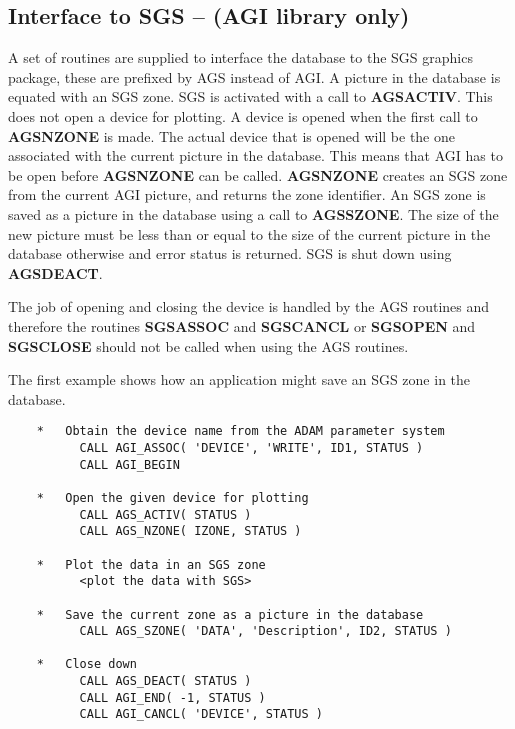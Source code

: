 \documentclass[twoside,11pt]{article}
\newcommand{\htmlref}[2]{#1}
\newcommand{\xref}[3]{#1}
\renewcommand{\_}{\texttt{\symbol{95}}}
\begin{document}
\subsection{Interface to SGS -- ({\bf AGI} library only)}

A set of routines are supplied to interface the database to the SGS graphics
package, these are prefixed by AGS\_ instead of AGI\_.
A picture in the database is equated with an SGS zone.
SGS is activated with a call to \htmlref{{\bf AGS\_ACTIV}}{AGS_ACTIV}.
This does not open a device for plotting.
A device is opened when the first call to \htmlref{{\bf AGS\_NZONE}}{AGS_NZONE}
is made.
The actual device that is opened will be the one associated with the
current picture in the database.
This means that AGI has to be open before {\bf AGS\_NZONE} can be called.
{\bf AGS\_NZONE} creates an SGS zone from the current AGI picture, and returns
the zone identifier.
An SGS zone is saved as a picture in the database using a call to
\htmlref{{\bf AGS\_SZONE}}{AGS_SZONE}. 
The size of the new picture must be less than or equal
to the size of the current picture in the database otherwise and error
status is returned.
SGS is shut down using \htmlref{{\bf AGS\_DEACT}}{AGS_DEACT}.

The job of opening and closing the device is handled by the AGS\_ routines
and therefore the routines \xref{{\bf SGS\_ASSOC}}{sun113}{SGS_ASSOC}
and \xref{{\bf SGS\_CANCL}}{sun113}{SGS_CANCL} or
\xref{{\bf SGS\_OPEN}}{sun85}{SGS_OPEN} and 
\xref{{\bf SGS\_CLOSE}}{sun85}{SGS_CLOSE} should not be called when using the
AGS\_ routines.

The first example shows how an application might save an SGS zone in the
database.
\begin{verbatim}
    *   Obtain the device name from the ADAM parameter system
          CALL AGI_ASSOC( 'DEVICE', 'WRITE', ID1, STATUS )
          CALL AGI_BEGIN

    *   Open the given device for plotting
          CALL AGS_ACTIV( STATUS )
          CALL AGS_NZONE( IZONE, STATUS )

    *   Plot the data in an SGS zone
          <plot the data with SGS>

    *   Save the current zone as a picture in the database
          CALL AGS_SZONE( 'DATA', 'Description', ID2, STATUS )

    *   Close down
          CALL AGS_DEACT( STATUS )
          CALL AGI_END( -1, STATUS )
          CALL AGI_CANCL( 'DEVICE', STATUS )
\end{verbatim}
\end{document}
